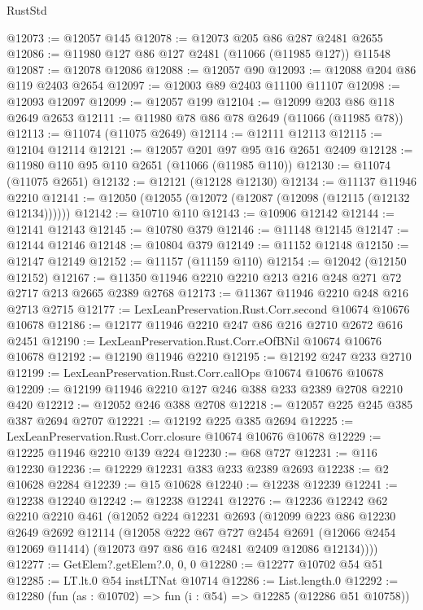 \begin{lexlean}{RustStd}
\begin{coremodule}
@12073 := @12057 @145
@12078 := @12073 @205 @86 @287 @2481 @2655
@12086 := @11980 @127 @86 @127 @2481 (@11066 (@11985 @127)) @11548
@12087 := @12078 @12086
@12088 := @12057 @90
@12093 := @12088 @204 @86 @119 @2403 @2654
@12097 := @12003 @89 @2403 @11100 @11107
@12098 := @12093 @12097
@12099 := @12057 @199
@12104 := @12099 @203 @86 @118 @2649 @2653
@12111 := @11980 @78 @86 @78 @2649 (@11066 (@11985 @78))
@12113 := @11074 (@11075 @2649)
@12114 := @12111 @12113
@12115 := @12104 @12114
@12121 := @12057 @201 @97 @95 @16 @2651 @2409
@12128 := @11980 @110 @95 @110 @2651 (@11066 (@11985 @110))
@12130 := @11074 (@11075 @2651)
@12132 := @12121 (@12128 @12130)
@12134 := @11137 @11946 @2210
@12141 := @12050 (@12055 (@12072 (@12087 (@12098 (@12115 (@12132 @12134))))))
@12142 := @10710 @110
@12143 := @10906 @12142
@12144 := @12141 @12143
@12145 := @10780 @379
@12146 := @11148 @12145
@12147 := @12144 @12146
@12148 := @10804 @379
@12149 := @11152 @12148
@12150 := @12147 @12149
@12152 := @11157 (@11159 @110)
@12154 := @12042 (@12150 @12152)
@12167 := @11350 @11946 @2210 @2210 @213 @216 @248 @271 @72 @2717 @213 @2665 @2389 @2768
@12173 := @11367 @11946 @2210 @248 @216 @2713 @2715
@12177 := LexLeanPreservation.Rust.Corr.second @10674 @10676 @10678
@12186 := @12177 @11946 @2210 @247 @86 @216 @2710 @2672 @616 @2451
@12190 := LexLeanPreservation.Rust.Corr.eOfBNil @10674 @10676 @10678
@12192 := @12190 @11946 @2210
@12195 := @12192 @247 @233 @2710
@12199 := LexLeanPreservation.Rust.Corr.callOps @10674 @10676 @10678
@12209 := @12199 @11946 @2210 @127 @246 @388 @233 @2389 @2708 @2210 @420
@12212 := @12052 @246 @388 @2708
@12218 := @12057 @225 @245 @385 @387 @2694 @2707
@12221 := @12192 @225 @385 @2694
@12225 := LexLeanPreservation.Rust.Corr.closure @10674 @10676 @10678
@12229 := @12225 @11946 @2210 @139 @224
@12230 := @68 @727
@12231 := @116 @12230
@12236 := @12229 @12231 @383 @233 @2389 @2693
@12238 := @2 @10628 @2284
@12239 := @15 @10628
@12240 := @12238 @12239
@12241 := @12238 @12240
@12242 := @12238 @12241
@12276 := @12236
    @12242
    @62
    @2210
    @2210
    @461
    (@12052
      @224
      @12231
      @2693
      (@12099
        @223
        @86
        @12230
        @2649
        @2692
        @12114
        (@12058
          @222
          @67
          @727
          @2454
          @2691
          (@12066 @2454 @12069 @11414)
          (@12073 @97 @86 @16 @2481 @2409 @12086 @12134))))
@12277 := GetElem?.getElem?.{0, 0, 0}
@12280 := @12277 @10702 @54 @51
@12285 := LT.lt.{0} @54 instLTNat @10714
@12286 := List.length.{0}
@12292 := @12280 (fun (as : @10702) => fun (i : @54) => @12285 (@12286 @51 @10758))

\end{coremodule}
\end{lexlean}
